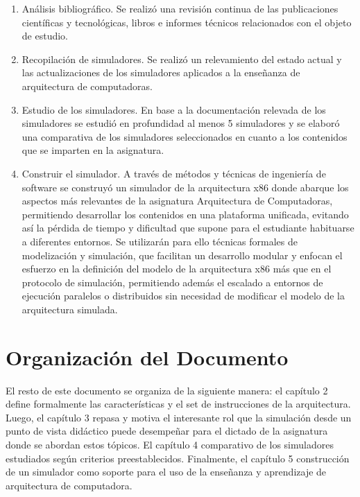 \documentclass[12pt,twoside]{templates/unerthesis}
\providecommand{\tightlist}{%
  \setlength{\itemsep}{0pt}\setlength{\parskip}{0pt}}
\begin{document}
\begin{enumerate}
\def\labelenumi{\alph{enumi}.}
\tightlist
\item
  Análisis bibliográfico.
  Se realizó una revisión continua de las publicaciones científicas y tecnológicas, libros e informes técnicos relacionados con el objeto de estudio.
\item
  Recopilación de simuladores.
  Se realizó un relevamiento del estado actual y las actualizaciones de los simuladores aplicados a la enseñanza de arquitectura de computadoras.
\item
  Estudio de los simuladores.
  En base a la documentación relevada de los simuladores se estudió en profundidad al menos 5 simuladores y se elaboró una comparativa de los simuladores seleccionados en cuanto a los contenidos que se imparten en la asignatura.
\item
  Construir el simulador.
  A través de métodos y técnicas de ingeniería de software se construyó un simulador de la arquitectura x86 donde abarque los aspectos más relevantes de la asignatura Arquitectura de Computadoras, permitiendo desarrollar los contenidos en una plataforma unificada, evitando así la pérdida de tiempo y dificultad que supone para el estudiante habituarse a diferentes entornos. Se utilizarán para ello técnicas formales de modelización y simulación, que facilitan un desarrollo modular y enfocan el esfuerzo en la definición del modelo de la arquitectura x86 más que en el protocolo de simulación, permitiendo además el escalado a entornos de ejecución paralelos o distribuidos sin necesidad de modificar el modelo de la arquitectura simulada.
\end{enumerate}

\hypertarget{organizaciuxf3n-del-documento}{%
\section{Organización del Documento}\label{organizaciuxf3n-del-documento}}

El resto de este documento se organiza de la siguiente manera: el capítulo 2 define formalmente las características y el set de instrucciones de la arquitectura. Luego, el capítulo 3 repasa y motiva el interesante rol que la simulación desde un punto de vista didáctico puede desempeñar para el dictado de la asignatura donde se abordan estos tópicos. El capítulo 4 comparativo de los simuladores estudiados según criterios preestablecidos. Finalmente, el capítulo 5 construcción de un simulador como soporte para el uso de la enseñanza y aprendizaje de arquitectura de computadora.
\end{document}
